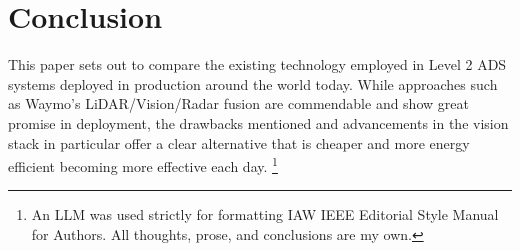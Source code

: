 \documentclass[12pt]{article}
\begin{document}
\section{Conclusion}

This paper sets out to compare the existing technology employed in Level 2 ADS systems
deployed in production around the world today. While approaches such as Waymo's
LiDAR/Vision/Radar fusion are commendable and show great promise in deployment, the
drawbacks mentioned and advancements in the vision stack in particular offer a
clear alternative that is cheaper and more energy efficient becoming more effective each day.
\footnote{An LLM was used strictly for formatting IAW IEEE Editorial Style Manual
	for Authors. All thoughts, prose, and conclusions are
my own.}
\newpage
{}
\printbibliography
\end{document}

